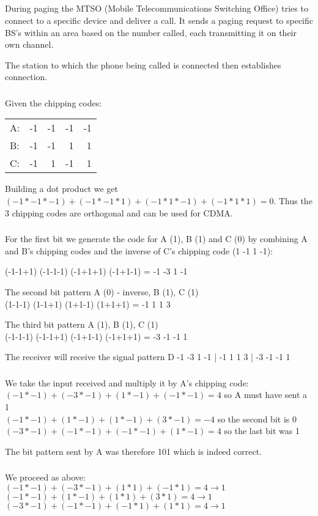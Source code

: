 \documentclass[12pt]{article}
\newcommand{\exercise}{\subsection{}\setcounter{subsubsection}{0}}
\newcommand{\multipartexercise}{\addtocounter{subsection}{1}\setcounter{subsubsection}{0}}
\newcommand{\exercisepart}{\subsubsection{}}
\begin{document}
\exercise
During paging the MTSO (Mobile Telecommunications Switching Office) tries to connect to a specific device and deliver a call. It sends a paging request to specific BS's within an area based on the number called, each transmitting it on their own channel.

The station to which the phone being called is connected then establishes connection.

\multipartexercise
\exercisepart
Given the chipping codes:\\
\begin{tabular}{lrrrr}
A:&-1&-1&-1&-1\\
B:&-1&-1&1&1\\
C:&-1&1&-1&1\\
\end{tabular}

Building a dot product we get $(-1*-1*-1)+(-1*-1*1)+(-1*1*-1)+(-1*1*1)=0$. Thus the 3 chipping codes are orthogonal and can be used for CDMA.

\exercisepart
For the first bit we generate the code for A (1), B (1) and C (0) by combining A and B's chipping codes and the inverse of C's chipping code (1 -1 1 -1):

\bigskip
\noindent
(-1-1+1) (-1-1-1) (-1+1+1) (-1+1-1) = -1 -3 1 -1

\bigskip
\noindent
The second bit pattern A (0) - inverse, B (1), C (1)\\
(1-1-1) (1-1+1) (1+1-1) (1+1+1) = -1 1 1 3

\bigskip
\noindent
The third bit pattern A (1), B (1), C (1)\\
(-1-1-1) (-1-1+1) (-1+1-1) (-1+1+1) = -3 -1 -1 1

\bigskip
\noindent
The receiver will receive the signal pattern D -1 -3 1 -1 | -1 1 1 3 | -3 -1 -1 1

\exercisepart
We take the input received and multiply it by A's chipping code:\\
$(-1*-1) + (-3*-1) + (1*-1) + (-1*-1) = 4$ so A must have sent a 1\\
$(-1*-1) + (1*-1) + (1*-1) + (3*-1) = -4$ so the second bit is 0\\
$(-3*-1) + (-1*-1) + (-1*-1) + (1*-1) = 4$ so the last bit was 1

\bigskip
\noindent
The bit pattern sent by A was therefore 101 which is indeed correct.

\exercisepart
We proceed as above:\\
$(-1*-1) + (-3*-1) + (1*1) + (-1*1) = 4 \rightarrow 1$\\
$(-1*-1) + (1*-1) + (1*1) + (3*1) = 4 \rightarrow 1$\\
$(-3*-1) + (-1*-1) + (-1*1) + (1*1) = 4 \rightarrow 1$
\end{document}
